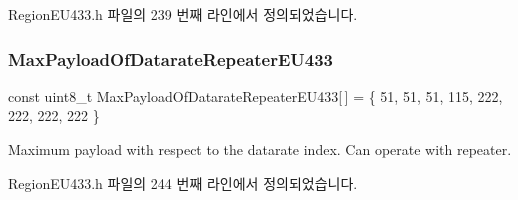 Region\+E\+U433.\+h 파일의 239 번째 라인에서 정의되었습니다.

\mbox{\label{group___r_e_g_i_o_n_e_u433_gacc4c6c7b7887ab34479b46fbc809c706}} 
\subsubsection{\texorpdfstring{Max\+Payload\+Of\+Datarate\+Repeater\+E\+U433}{MaxPayloadOfDatarateRepeaterEU433}}
{\footnotesize\ttfamily const uint8\+\_\+t Max\+Payload\+Of\+Datarate\+Repeater\+E\+U433\mbox{[}$\,$\mbox{]} = \{ 51, 51, 51, 115, 222, 222, 222, 222 \}\hspace{0.3cm}{\ttfamily [static]}}

Maximum payload with respect to the datarate index. Can operate with repeater. 

Region\+E\+U433.\+h 파일의 244 번째 라인에서 정의되었습니다.

